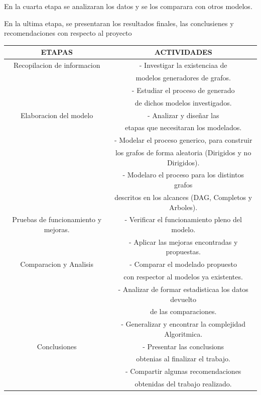\documentclass[11pt]{extarticle}
\begin{document}
    En la cuarta etapa se analizaran los datos y se los comparara con 
    otros modelos.
    \hfill\break

    En la ultima etapa, se presentaran los resultados finales, las
    conclusienes y recomendaciones con respecto al proyecto

    \begin{center}
      \begin{tabular}{||c | c||} 
       \hline
       ETAPAS & ACTIVIDADES\\ [0.5ex] 
       \hline\hline
       Recopilacion de informacion &  - Investigar la existenciaa de \\ & modelos generadores de grafos.\\
        & - Estudiar el proceso de generado\\ & de dichos modelos investigados.\\
       \hline
       Elaboracion del modelo & - Analizar y diseñar las \\ & etapas que necesitaran los modelados.\\
        & - Modelar el proceso generico, para construir\\
        & los grafos de forma aleatoria (Dirigidos y no Dirigidos). \\
        & - Modelaro el proceso para los distintos grafos\\ 
        & descritos en los alcances (DAG, Completos y Arboles).\\
       \hline
       Pruebas de funcionamiento y mejoras.
        & - Verificar el funcionamiento pleno del modelo.\\
        & - Aplicar las mejoras encontradas y propuestas.\\
       \hline
       Comparacion y Analisis & - Comparar el modelado propuesto \\
        & con respector al modelos ya existentes. \\
        & - Analizar de formar estadisticaa los datos devuelto\\
        &  de las comparaciones.\\
        & - Generalizar y encontrar la complejidad Algoritmica.\\
       \hline
       Conclusiones & - Presentar las conclusions\\ & obtenias al finalizar el trabajo. \\ 
       & - Compartir algunas recomendaciones \\ & obtenidas del trabajo realizado.\\
       \hline
      \end{tabular}
    \end{center}
\end{document}
